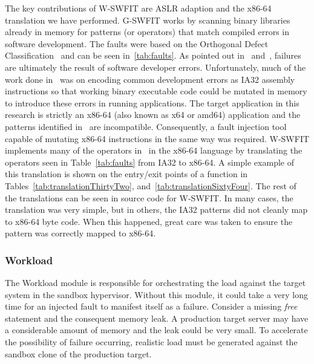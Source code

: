 The key contributions of W-SWFIT are ASLR adaption and the x86-64 translation
we have performed.  G-SWFIT works by scanning binary libraries already in
memory for patterns (or operators) that match compiled errors in software
development.  The faults were based on the Orthogonal Defect
Classification~\cite{bridge1998} and can be seen in~\ref{tab:faults}.  As
pointed out in~\cite{salfnerSurvey} and~\cite{gswfit}, failures are ultimately
the result of software developer errors.  Unfortunately, much of the work done
in~\cite{gswfit} was on encoding common development errors as IA32 assembly
instructions so that working binary executable code could be mutated in memory
to introduce these errors in running applications.  The target application in
this research is strictly an x86-64 (also known as x64 or amd64) application
and the patterns identified in~\cite{gswfit} are incompatible.  Consequently, a
fault injection tool capable of mutating x86-64 instructions in the same way
was required.  W-SWFIT implements many of the operators in~\cite{gswfit} in
the x86-64 language by translating the operators seen in Table~\ref{tab:faults}
from IA32 to x86-64.  A simple example of this translation is shown on the
entry/exit points of a function in Tables~\ref{tab:translationThirtyTwo},
and~\ref{tab:translationSixtyFour}.  The rest of the translations can be seen
in source code for W-SWFIT.  In many cases, the translation was very simple,
but in others, the IA32 patterns did not cleanly map to x86-64 byte code.  When
this happened, great care was taken to ensure the pattern was correctly mapped
to x86-64.

\tabFaults
\tabTranslationThirtyTwo
\tabTranslationSixtyFour

\subsubsection{Workload} \label{sec:workloadMgr} 
The Workload module is responsible for orchestrating the load against the
target system in the sandbox hypervisor.  Without this module, it could take a
very long time for an injected fault to manifest itself as a failure.  Consider
a missing \emph{free} statement and the consequent memory leak.  A production
target server may have a considerable amount of memory and the leak could be
very small.  To accelerate the possibility of failure occurring, realistic load
must be generated against the sandbox clone of the production target.

